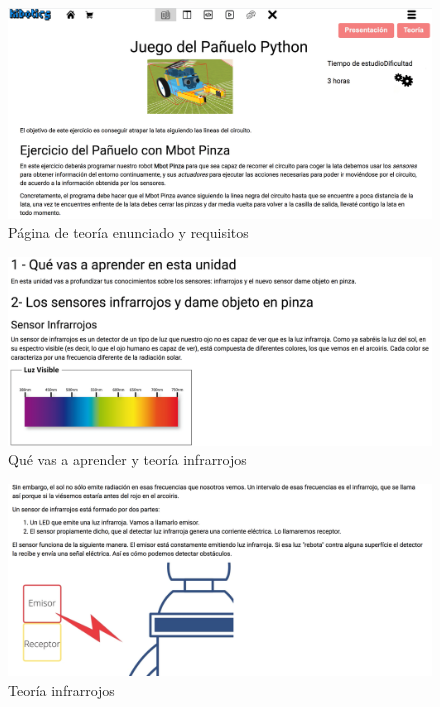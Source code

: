 \begin{figure}[H]
    \centering
    \includegraphics[width=1\textwidth, height=0.5\textwidth]{chapters/images/teoriag1.png}
    \caption{Página de teoría enunciado y requisitos}
    \label{fig:my_label}
\end{figure}
\begin{figure}[H]
    \centering
    \includegraphics[width=1\textwidth, height=0.4\textwidth]{chapters/images/teoriag2.png}
    \caption{Qué vas a aprender y teoría infrarrojos}
    \label{fig:my_label}
\end{figure}
\begin{figure}[H]
    \centering
    \includegraphics[width=1\textwidth, height=0.4\textwidth]{chapters/images/teoriag2_2.png}
    \caption{Teoría infrarrojos}
    \label{fig:my_label}
\end{figure}
